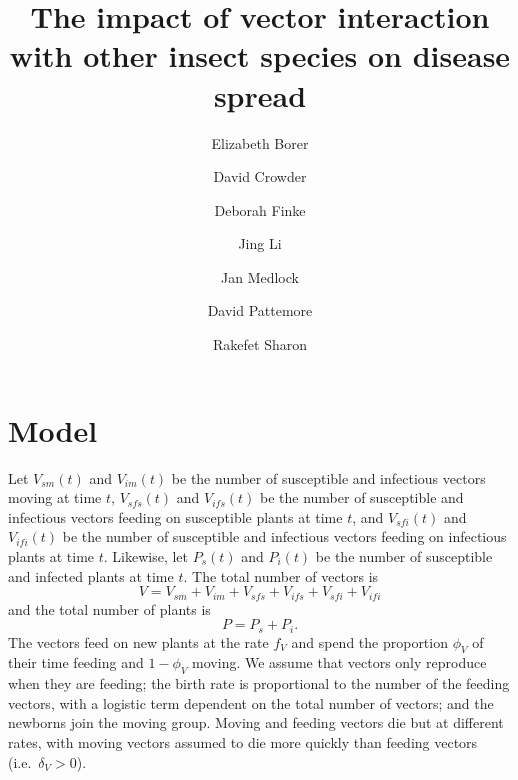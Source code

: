 \documentclass{article}
\title{The impact of vector interaction with other insect species on
  disease spread}
\author{
  Elizabeth Borer
  \and
  David Crowder
  \and
  Deborah Finke
  \and
  Jing Li
  \and
  Jan Medlock
  \and
  David Pattemore
  \and
  Rakefet Sharon
}
\begin{document}
\maketitle

\section{Model}

Let $V_{sm}(t)$ and $V_{im}(t)$ be the number of susceptible and
infectious vectors moving at time $t$, $V_{sfs}(t)$ and $V_{ifs}(t)$
be the number of susceptible and infectious vectors feeding on
susceptible plants at time $t$, and $V_{sfi}(t)$ and $V_{ifi}(t)$ be
the number of susceptible and infectious vectors feeding on infectious
plants at time $t$.  Likewise, let $P_s(t)$ and $P_i(t)$ be the number
of susceptible and infected plants at time $t$.  The total number of vectors is
\begin{equation}
  V = V_{sm} + V_{im} + V_{sfs} + V_{ifs} + V_{sfi} + V_{ifi}
\end{equation}
and the total number of plants is
\begin{equation}
  P = P_s + P_i.
\end{equation}
The vectors feed on new plants at the rate $f_V$ and spend the
proportion $\phi_V$ of their time feeding and $1 - \phi_V$ moving.  We
assume that vectors only reproduce when they are feeding; the birth
rate is proportional to the number of the feeding vectors, with a
logistic term dependent on the total number of vectors; and the
newborns join the moving group.  Moving and feeding vectors die but at
different rates, with moving vectors assumed to die more quickly than
feeding vectors (i.e.~$\delta_V > 0$).
\end{document}
